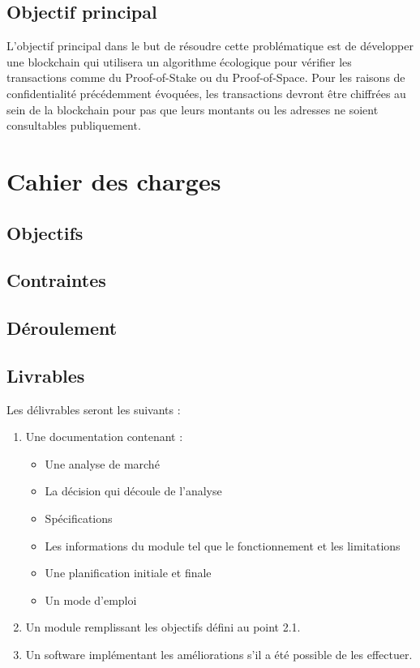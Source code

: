 \subsection*{Objectif principal}

L'objectif principal dans le but de résoudre cette problématique est de développer une blockchain qui utilisera un algorithme écologique pour vérifier les transactions comme du Proof-of-Stake ou du Proof-of-Space. Pour les raisons de confidentialité précédemment évoquées, les transactions devront être chiffrées au sein de la blockchain pour pas que leurs montants ou les adresses ne soient consultables publiquement.

\section*{Cahier des charges}

\subsection*{Objectifs}

\subsection*{Contraintes}

\subsection*{Déroulement}

\subsection*{Livrables}
Les délivrables seront les suivants :
\begin{enumerate}
\item Une documentation contenant :
	\begin{itemize}
	\item Une analyse de marché
	\item La décision qui découle de l’analyse
	\item Spécifications
	\item Les informations du module tel que le fonctionnement et les limitations 
	\item Une planification initiale et finale
	\item Un mode d’emploi
	\end{itemize}
\item Un module remplissant les objectifs défini au point 2.1.
\item Un software implémentant les améliorations s’il a été possible de les effectuer.
\end{enumerate}
